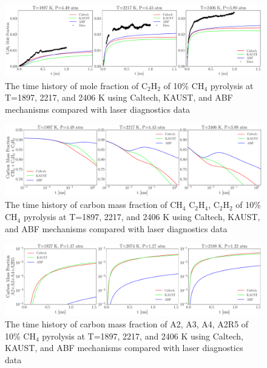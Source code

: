 \begin{figure}[H]
	\centering
	\includegraphics[width=1\textwidth]{Figures/Results/Shocktube/Stanford/September/10CH4_C2H2_mechs_nosoot_subset.pdf}
	\caption{The time history of mole fraction of $\mathrm{C_2H_2}$ of 10\% $\mathrm{CH_4}$ pyrolysis at T=1897, 2217, and 2406 K using Caltech, KAUST, and ABF mechanisms compared with laser diagnostics data}
	\label{fig:shocktubest_10ch4_c2h2_nosoot_subset} 
\end{figure}

\begin{figure}[H]
	\centering
	\includegraphics[width=1\textwidth]{Figures/Results/Shocktube/Stanford/September/10CH4_CCC_mechs_nosoot_subset.pdf}
	\caption{The time history of carbon mass fraction of $\mathrm{CH_4}$ $\mathrm{C_2H_4}$, $\mathrm{C_2H_2}$ of 10\% $\mathrm{CH_4}$ pyrolysis at T=1897, 2217, and 2406 K using Caltech, KAUST, and ABF mechanisms compared with laser diagnostics data}
	\label{fig:shocktubest_10ch4_ccc_nosoot_subset} 
\end{figure}


\begin{figure}[H]
	\centering
	\includegraphics[width=1\textwidth]{Figures/Results/Shocktube/Stanford/September/10CH4_SPC_mechs_nosoot_subset.pdf}
	\caption{The time history of carbon mass fraction of A2, A3, A4, A2R5 of 10\% $\mathrm{CH_4}$ pyrolysis at T=1897, 2217, and 2406 K using Caltech, KAUST, and ABF mechanisms compared with laser diagnostics data}
	\label{fig:shocktubest_10ch4_spc_nosoot_subset} 
\end{figure}

